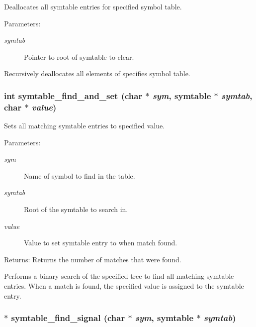 Deallocates all symtable entries for specified symbol table. 

\begin{Desc}
\item[Parameters:]
\begin{description}
\item[{\em symtab}]Pointer to root of symtable to clear.\end{description}
\end{Desc}
Recursively deallocates all elements of specifies symbol table. 
\subsubsection{\setlength{\rightskip}{0pt plus 5cm}int symtable\_\-find\_\-and\_\-set (char $\ast$ {\em sym}, {\bf symtable} $\ast$ {\em symtab}, char $\ast$ {\em value})}\label{symtable_8h_a2}


Sets all matching symtable entries to specified value. 

\begin{Desc}
\item[Parameters:]
\begin{description}
\item[{\em sym}]Name of symbol to find in the table. \item[{\em symtab}]Root of the symtable to search in. \item[{\em value}]Value to set symtable entry to when match found.\end{description}
\end{Desc}
\begin{Desc}
\item[Returns:]Returns the number of matches that were found.\end{Desc}
Performs a binary search of the specified tree to find all matching symtable entries. When a match is found, the specified value is assigned to the symtable entry. 
\subsubsection{$\ast$ symtable\_\-find\_\-signal (char $\ast$ {\em sym}, {\bf symtable} $\ast$ {\em symtab})}\label{symtable_8h_a1}



